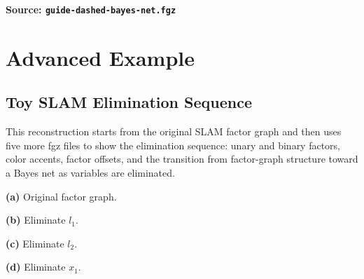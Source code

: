 \documentclass{article}
\newcommand{\fgzAdvancedScale}{0.62}
\newcommand{\fgzAdvancedPanel}[1]{\scalebox{\fgzAdvancedScale}{}}
\begin{document}
\vspace{0.5cm}
\begin{samepage}
  \centering
  \scalebox{0.76}{}

  \medskip
  \noindent\textbf{Source: \texttt{guide-dashed-bayes-net.fgz}}
\end{samepage}

\clearpage
\section{Advanced Example}

\subsection{Toy SLAM Elimination Sequence}
This reconstruction starts from the original SLAM factor graph and then uses five more
fgz files to show the elimination sequence: unary and binary factors, color accents,
factor offsets, and the transition from factor-graph structure toward a Bayes net as
variables are eliminated.

\vspace{0.5cm}
\begin{samepage}
  \noindent
  \begin{minipage}[t]{0.48\textwidth}
    \centering
    \fgzAdvancedPanel{slam-original-factor-graph.fgz.tex}

    \smallskip
    \textbf{(a)} Original factor graph.
  \end{minipage}\hfill
  \begin{minipage}[t]{0.48\textwidth}
    \centering
    \fgzAdvancedPanel{slam-eliminate-l1.fgz.tex}

    \smallskip
    \textbf{(b)} Eliminate $l_1$.
  \end{minipage}\hfill
\end{samepage}

\medskip

\begin{samepage}
  \noindent
  \begin{minipage}[t]{0.48\textwidth}
    \centering
    \fgzAdvancedPanel{slam-eliminate-l2.fgz.tex}

    \smallskip
    \textbf{(c)} Eliminate $l_2$.
  \end{minipage}\hfill
  \begin{minipage}[t]{0.48\textwidth}
    \centering
    \fgzAdvancedPanel{slam-eliminate-x1.fgz.tex}

    \smallskip
    \textbf{(d)} Eliminate $x_1$.
  \end{minipage}
\end{samepage}
\end{document}
